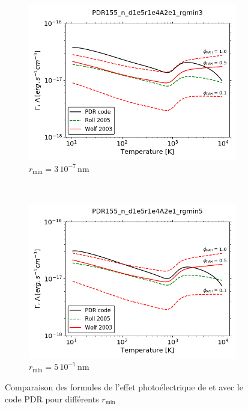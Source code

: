 \begin{figure}[!h]
    \centering
    \begin{subfigure}[t]{0.49\textwidth} %
        \centering \includegraphics[trim = {0 0 0 1cm},clip,width=1\textwidth]{figure/Cl/pePAH/pe_formulae_rgmin3.png}
        \caption{$r_\mathrm{min} = 3\,10^{-7} \, \mathrm{nm}$}
    \end{subfigure}
    ~ 
   \begin{subfigure}[t]{0.49\textwidth} %
        \centering \includegraphics[trim = {0 0 0 1cm},clip,width=1\textwidth]{figure/Cl/pePAH/pe_formulae_rgmin5.png}
        \caption{$r_\mathrm{min} = 5\,10^{-7}\, \mathrm{nm}$}
    \end{subfigure}
    \caption{Comparaison des formules de l'effet photoélectrique de \cite{Rollig2005} et \cite{Wolfire_2003} avec le code PDR pour différents $r_\mathrm{min}$}
    \label{fig:Cl:pePAH}
\end{figure}

